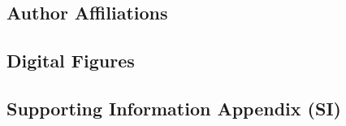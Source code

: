 \documentclass[9pt,twocolumn,twoside]{pnas-new}
\begin{document}
\subsection*{Author Affiliations}


%


\subsection*{Digital Figures}





\subsection*{Supporting Information Appendix (SI)}

\end{document}
